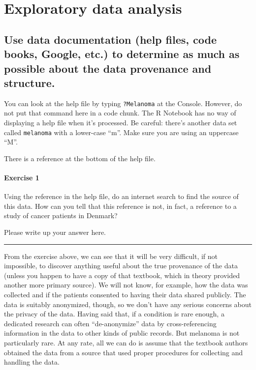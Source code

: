 \documentclass[
]{book}
\begin{document}
\hypertarget{hypothesis2ex-eda}{%
\section{Exploratory data analysis}\label{hypothesis2ex-eda}}

\hypertarget{hypothesis2-ex-documentation}{%
\subsection{Use data documentation (help files, code books, Google, etc.) to determine as much as possible about the data provenance and structure.}\label{hypothesis2-ex-documentation}}

You can look at the help file by typing \texttt{?Melanoma} at the Console. However, do not put that command here in a code chunk. The R Notebook has no way of displaying a help file when it's processed. Be careful: there's another data set called \texttt{melanoma} with a lower-case ``m''. Make sure you are using an uppercase ``M''.

There is a reference at the bottom of the help file.

\hypertarget{exercise-1-8}{%
\paragraph*{Exercise 1}\label{exercise-1-8}}

Using the reference in the help file, do an internet search to find the source of this data. How can you tell that this reference is not, in fact, a reference to a study of cancer patients in Denmark?

Please write up your answer here.

\begin{center}\rule{0.5\linewidth}{0.5pt}\end{center}

From the exercise above, we can see that it will be very difficult, if not impossible, to discover anything useful about the true provenance of the data (unless you happen to have a copy of that textbook, which in theory provided another more primary source). We will not know, for example, how the data was collected and if the patients consented to having their data shared publicly. The data is suitably anonymized, though, so we don't have any serious concerns about the privacy of the data. Having said that, if a condition is rare enough, a dedicated research can often ``de-anonymize'' data by cross-referencing information in the data to other kinds of public records. But melanoma is not particularly rare. At any rate, all we can do is assume that the textbook authors obtained the data from a source that used proper procedures for collecting and handling the data.
\end{document}
